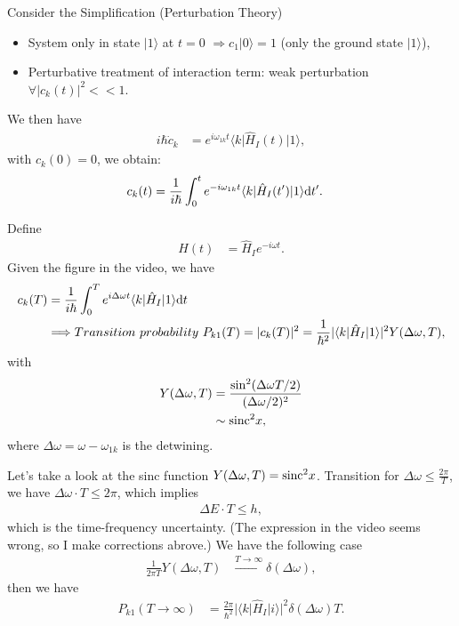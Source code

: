 \documentclass[../../note.tex]{subfiles}
\begin{document}
Consider the Simplification (Perturbation Theory)
\begin{itemize}
    \item System only in state $\vert 1 \rangle$ at $t = 0$ $\Longrightarrow c_1 \vert 0 \rangle = 1$ (only the ground state $\vert 1 \rangle$),
    \item Perturbative treatment of interaction term: weak perturbation $\forall \vert c_k(t) \vert^2 <<1$.
\end{itemize}
We then have
\begin{align}
    i \hbar \dot{c}_k
    &= e^{i \omega_{1k}t} \langle k \vert \hat{H}_I(t) \vert 1 \rangle,
\end{align}
with $c_k(0) = 0$, we obtain:
\begin{align}
    c_k(t)
    &= \frac{1}{i \hbar} \int_0^t e^{-i \omega_{1k} t} \langle k \vert \hat{H}_I(t^\prime)\vert 1 \rangle{\rm d}t^\prime.
\end{align}
\begin{example}
    Define
    \begin{align}
        \hat{H}(t)
        &= \hat{H}_I e^{-i \omega t}.
    \end{align}
    Given the figure in the video, we have
    \begin{align}
        c_k(T)
        &= \frac{1}{i \hbar} \int_{0}^T e^{i \Delta \omega t} \langle k \vert \hat{H}_I \vert 1 \rangle {\rm d}t \\
        &\Longrightarrow Transition~probability~P_{k1}(T) = \vert c_k(T) \vert^2 = \frac{1}{\hbar^2} \vert \langle k \vert \hat{H}_I \vert 1 \rangle \vert^2 Y(\Delta \omega, T),
    \end{align}
    with 
    \begin{align}
        Y(\Delta \omega, T)
        &= \frac{\sin^2(\Delta \omega T/2)}{(\Delta \omega /2)^2} \\
        &\sim {\rm sinc}^2 x,
    \end{align}
    where $\Delta \omega = \omega - \omega_{1 k}$ is the detwining.
\end{example}

Let's take a look at the sinc function $Y(\Delta \omega, T) = {\rm sinc}^2 x$. Transition for $\Delta \omega \leq \frac{2 \pi}{T}$, we have $\Delta \omega \cdot T\leq 2 \pi$, which implies
\begin{align}
    \Delta E \cdot T \leq h,
\end{align}
which is the time-frequency uncertainty. (The expression in the video seems wrong, so I make corrections abrove.) We have the following case
\begin{align}
    \frac{1}{2 \pi T} Y(\Delta \omega, T)
    &\stackrel{T \rightarrow \infty}{\rightarrow} \delta(\Delta \omega),
\end{align}
then we have
\begin{align}
    P_{k1}(T \rightarrow \infty)
    &= \frac{2 \pi}{\hbar^2} \vert \langle k \vert \hat{H}_I \vert i \rangle \vert^2 \delta(\Delta \omega) T.
\end{align}
\end{document}
